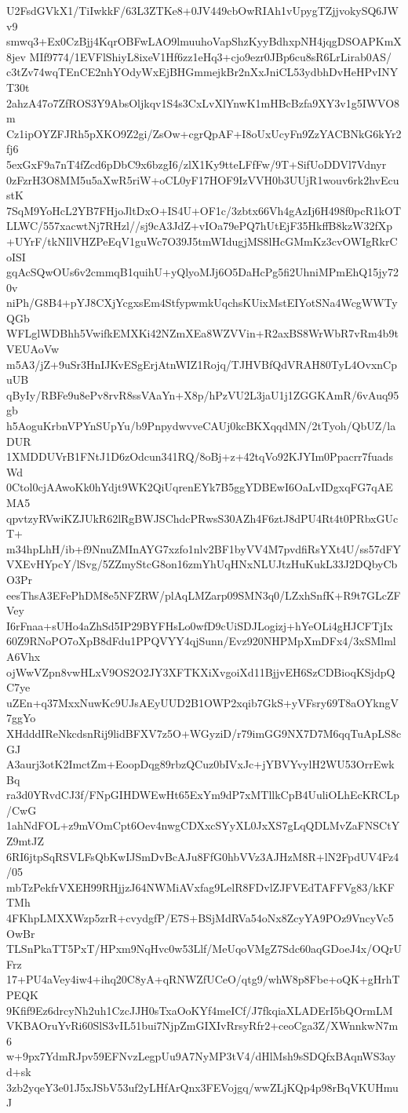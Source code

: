 U2FsdGVkX1/TiIwkkF/63L3ZTKe8+0JV449cbOwRIAh1vUpygTZjjvokySQ6JWv9
smwq3+Ex0CzBjj4KqrOBFwLAO9lmuuhoVapShzKyyBdhxpNH4jqgDSOAPKmX8jev
MIf9774/1EVFlShiyL8ixeV1Hf6zz1eHq3+cjo9ezr0JBp6cu8sR6LrLirab0AS/
c3tZv74wqTEnCE2nhYOdyWxEjBHGmmejkBr2nXxJniCL53ydbhDvHeHPvINYT30t
2ahzA47o7ZfROS3Y9AbsOljkqv1S4s3CxLvXlYnwK1mHBcBzfa9XY3v1g5IWVO8m
Cz1ipOYZFJRh5pXKO9Z2gi/ZsOw+cgrQpAF+I8oUxUcyFn9ZzYACBNkG6kYr2fj6
5exGxF9a7nT4fZcd6pDbC9x6bzgI6/zlX1Ky9tteLFfFw/9T+SifUoDDVl7Vdnyr
0zFzrH3O8MM5u5aXwR5riW+oCL0yF17HOF9IzVVH0b3UUjR1wouv6rk2hvEcustK
7SqM9YoHcL2YB7FHjoJltDxO+IS4U+OF1c/3zbtx66Vh4gAzIj6H498f0pcR1kOT
LLWC/557xacwtNj7RHzl//sj9cA3JdZ+vIOa79ePQ7hUtEjF35HkffB8kzW32fXp
+UYrF/tkNIlVHZPeEqV1guWc7O39J5tmWIdugjMS8lHcGMmKz3cvOWIgRkrCoISI
gqAcSQwOUs6v2cmmqB1quihU+yQlyoMJj6O5DaHcPg5fi2UhniMPmEhQ15jy720v
niPh/G8B4+pYJ8CXjYcgxsEm4StfypwmkUqchsKUixMstEIYotSNa4WcgWWTyQGb
WFLglWDBhh5VwifkEMXKi42NZmXEa8WZVVin+R2axBS8WrWbR7vRm4b9tVEUAoVw
m5A3/jZ+9uSr3HnIJKvESgErjAtnWIZ1Rojq/TJHVBfQdVRAH80TyL4OvxnCpuUB
qByIy/RBFe9u8ePv8rvR8ssVAaYn+X8p/hPzVU2L3jaU1j1ZGGKAmR/6vAuq95gb
h5AoguKrbnVPYnSUpYu/b9PnpydwvveCAUj0kcBKXqqdMN/2tTyoh/QbUZ/laDUR
1XMDDUVrB1FNtJ1D6zOdcun341RQ/8oBj+z+42tqVo92KJYIm0Ppacrr7fuadsWd
0Ctol0cjAAwoKk0hYdjt9WK2QiUqrenEYk7B5ggYDBEwI6OaLvIDgxqFG7qAEMA5
qpvtzyRVwiKZJUkR62lRgBWJSChdcPRwsS30AZh4F6ztJ8dPU4Rt4t0PRbxGUcT+
m34hpLhH/ib+f9NnuZMInAYG7xzfo1nlv2BF1byVV4M7pvdfiRsYXt4U/ss57dFY
VXEvHYpcY/lSvg/5ZZmyStcG8on16zmYhUqHNxNLUJtzHuKukL33J2DQbyCbO3Pr
eesThsA3EFePhDM8e5NFZRW/plAqLMZarp09SMN3q0/LZxhSnfK+R9t7GLcZFVey
I6rFnaa+sUHo4aZhSd5IP29BYFHsLo0wfD9cUiSDJLogizj+hYeOLi4gHJCFTjIx
60Z9RNoPO7oXpB8dFdu1PPQVYY4qjSunn/Evz920NHPMpXmDFx4/3xSMlmlA6Vhx
ojWwVZpn8vwHLxV9OS2O2JY3XFTKXiXvgoiXd11BjjvEH6SzCDBioqKSjdpQC7ye
uZEn+q37MxxNuwKc9UJsAEyUUD2B1OWP2xqib7GkS+yVFsry69T8aOYkngV7ggYo
XHdddIReNkcdsnRij9lidBFXV7z5O+WGyziD/r79imGG9NX7D7M6qqTuApLS8cGJ
A3aurj3otK2ImctZm+EoopDqg89rbzQCuz0bIVxJc+jYBVYvylH2WU53OrrEwkBq
ra3d0YRvdCJ3f/FNpGIHDWEwHt65ExYm9dP7xMTllkCpB4UuliOLhEcKRCLp/CwG
1ahNdFOL+z9mVOmCpt6Oev4nwgCDXxcSYyXL0JxXS7gLqQDLMvZaFNSCtYZ9mtJZ
6RI6jtpSqRSVLFsQbKwIJSmDvBcAJu8FfG0hbVVz3AJHzM8R+lN2FpdUV4Fz4/05
mbTzPekfrVXEH99RHjjzJ64NWMiAVxfag9LelR8FDvlZJFVEdTAFFVg83/kKFTMh
4FKhpLMXXWzp5zrR+cvydgfP/E7S+BSjMdRVa54oNx8ZcyYA9POz9VncyVc5OwBr
TLSnPkaTT5PxT/HPxm9NqHvc0w53Llf/MeUqoVMgZ7Sdc60aqGDoeJ4x/OQrUFrz
17+PU4aVey4iw4+ihq20C8yA+qRNWZfUCeO/qtg9/whW8p8Fbe+oQK+gHrhTPEQK
9Kfif9Ez6drcyNh2uh1CzcJJH0sTxaOoKYf4meICf/J7fkqiaXLADErI5bQOrmLM
VKBAOruYvRi60SlS3vIL51bui7NjpZmGIXIvRrsyRfr2+ceoCga3Z/XWnnkwN7m6
w+9px7YdmRJpv59EFNvzLegpUu9A7NyMP3tV4/dHlMsh9sSDQfxBAqnWS3ayd+sk
3zb2yqeY3e01J5xJSbV53uf2yLHfArQnx3FEVojgq/wwZLjKQp4p98rBqVKUHmuJ
